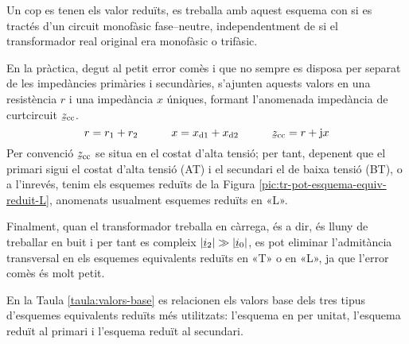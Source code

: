 Un cop es tenen els valor reduïts, es treballa amb aquest esquema con si es tractés d'un circuit monofàsic fase--neutre, independentment de si el transformador real original era monofàsic o trifàsic.

En la pràctica, degut al petit error comès i que no sempre es disposa per separat de les impedàncies primàries i secundàries,  s'ajunten aquests valors en una resistència $r$ i una  impedància $x$ úniques, formant l'anomenada impedància de curtcircuit $\cmplx{z}\ped{cc}$.
\begin{equation}
    r= r\ped{1}+r\ped{2} \qquad\quad x= x\ped{d1}+x\ped{d2} \qquad\quad \cmplx{z}\ped{cc} = r + \ju x
\end{equation}
Per convenció $\cmplx{z}\ped{cc}$ se situa en el costat d'alta tensió; per tant, depenent que el primari  sigui el costat d'alta tensió (AT) i el secundari el de baixa tensió (BT), o a l'inrevés, tenim els esquemes reduïts de la Figura \vref{pic:tr-pot-esquema-equiv-reduit-L}, anomenats usualment esquemes reduïts en «L».  
\begin{center}
    
    \label{pic:tr-pot-esquema-equiv-reduit-L}
\end{center}

\vspace{-4mm}
Finalment, quan el transformador treballa en càrrega, és a dir, és lluny de treballar en buit i per tant es compleix $|\cmplx{i}_2| \gg |\cmplx{i}_0|$, es pot eliminar l'admitància transversal en els esquemes equivalents reduïts en «T» o en «L», ja que l'error comès és molt petit.

En la  Taula \vref{taula:valors-base} es relacionen els valors base dels tres tipus d'esquemes equivalents reduïts més utilitzats: l'esquema en per unitat, l'esquema reduït al primari i l'esquema reduït al secundari.

